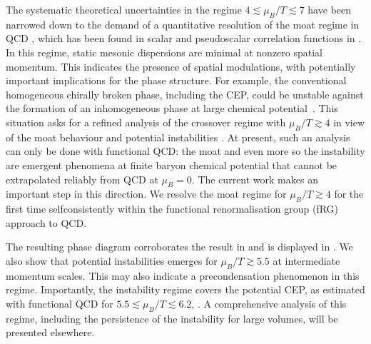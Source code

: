 \documentclass[10pt,prd,superscriptaddress,twocolumn]{revtex4-2}
\begin{document}
The systematic theoretical uncertainties in the regime $4 \lesssim \mu_B /T \lesssim 7$ have been narrowed down to the demand of a quantitative resolution of the moat regime in QCD \cite{Pisarski:2021qof, Rennecke:2025bcw}, which has been found in scalar and pseudoscalar correlation functions in \cite{Fu:2019hdw, Fu:2024rto}. In this regime, static mesonic dispersions are minimal at nonzero spatial momentum. This indicates the presence of spatial modulations, with potentially important implications for the phase structure. For example, the conventional homogeneous chirally broken phase, including the CEP, could be unstable against the formation of an inhomogeneous phase at large chemical potential~\cite{Buballa:2014tba}. 
This situation asks for a refined analysis of the crossover regime with $\mu_B /T \gtrsim 4$ in view of the moat behaviour and potential instabilities \cite{Fu:2024rto}. At present, such an analysis can only be done with functional QCD: the moat and even more so the instability are emergent phenomena at finite baryon chemical potential that cannot be extrapolated reliably from QCD at $\mu_B=0$. 
The current work makes an important step in this direction. We resolve the moat regime for $\mu_B/T\gtrsim 4$ for the first time selfconsistently within the functional renormalisation group (fRG) approach to QCD.

The resulting phase diagram corroborates the result in \cite{Fu:2019hdw} and is displayed in . We also show that potential instabilities emerges for $\mu_B/T\gtrsim 5.5$ at intermediate momentum scales. This may also indicate a precondensation phenomenon \cite{Khan:2015puu, PGPS2026} in this regime.
Importantly, the instability regime covers the potential CEP, as estimated with functional QCD for $5.5\lesssim \mu_B/T\lesssim 6.2$, \cite{Fu:2019hdw, Gao:2020fbl, Gunkel:2021oya}. A comprehensive analysis of this regime, including the persistence of the instability for large volumes, will be presented elsewhere.
\end{document}
